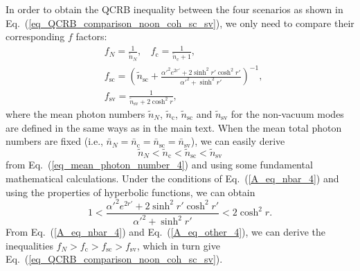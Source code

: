 \documentclass[aps,pra,reprint,showpacs,groupedaddress]{revtex4-1}
\begin{document}
In order to obtain the QCRB inequality between the four scenarios as shown in Eq.~(\ref{eq_QCRB_comparison_noon_coh_sc_sv}), we only need to compare their corresponding $f$ factors:
\begin{eqnarray}
    &\displaystyle f_N = \frac{1}{\tilde{n}_N},
    \ \ \ \  f_\text{c} = \frac{1}{\tilde{n}_\text{c}+1},
\nonumber\\
    &\displaystyle f_\text{sc} = \left(\tilde{n}_\text{sc}+\frac{\alpha'^2 e^{2r'}+ 2\sinh^2{r'}\cosh^2{r'}}{\alpha'^2+\sinh^2{r'}}\right)^{-1},
\nonumber\\
    &\displaystyle f_\text{sv} = \frac{1}{\tilde{n}_\text{sv}+2\cosh^2{r}},
\label{4f}
\end{eqnarray}
where the mean photon numbers $\tilde{n}_N$, $\tilde{n}_\text{c}$, $\tilde{n}_\text{sc}$ and $\tilde{n}_\text{sv}$ for the non-vacuum modes  are defined in the same ways as in the main text.
When the mean total photon numbers are fixed (i.e., $\bar{n}_N=\bar{n}_\text{c}=\bar{n}_\text{sc}=\bar{n}_\text{sv}$), we can easily derive
\begin{equation}
    \tilde{n}_N < \tilde{n}_\text{c} < \tilde{n}_\text{sc} < \tilde{n}_\text{sv}
    \label{A_eq_nbar_4}
\end{equation}
from Eq.~(\ref{eq_mean_photon_number_4}) and using some fundamental mathematical calculations.
Under the conditions of Eq.~(\ref{A_eq_nbar_4}) and using the properties of hyperbolic functions, we can obtain
\begin{equation}
    1  < \frac{\alpha'^2 e^{2r'}+ 2\sinh^2{r'}\cosh^2{r'}}{\alpha'^2+\sinh^2{r'}} < 2\cosh^2{r}.
    \label{A_eq_other_4}
\end{equation}
From Eq.~(\ref{A_eq_nbar_4}) and Eq.~(\ref{A_eq_other_4}), we can derive the inequalities $f_N > f_{\text{c}} > f_{\text{sc}} > f_{\text{sv}}$, which in turn give Eq.~(\ref{eq_QCRB_comparison_noon_coh_sc_sv}).
\end{document}
